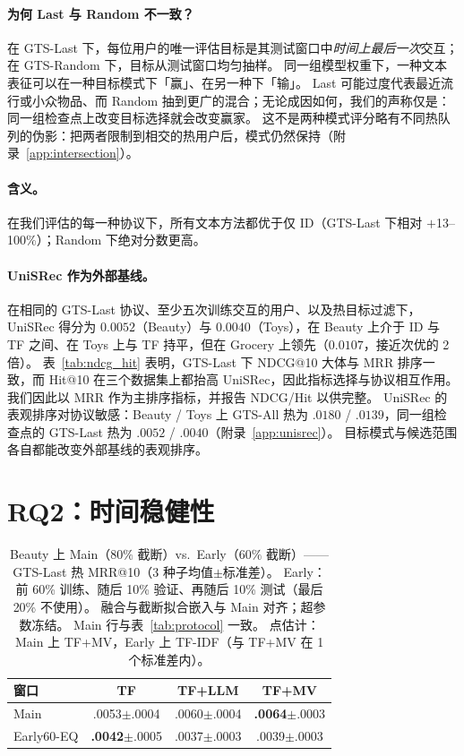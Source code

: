 \documentclass[sigconf,natbib=true,anonymous]{acmart}
\newcommand{\tfidf}{\textsc{TF-IDF}\xspace}
\newcommand{\tfmv}{\textsc{TF+MV}\xspace}
\begin{document}
\paragraph{为何 Last 与 Random 不一致？}
在 GTS-Last 下，每位用户的唯一评估目标是其测试窗口中\emph{时间上最后一次}交互；在 GTS-Random 下，目标从测试窗口均匀抽样。
同一组模型权重下，一种文本表征可以在一种目标模式下「赢」、在另一种下「输」。
Last 可能过度代表最近流行或小众物品、而 Random 抽到更广的混合；无论成因如何，我们的声称仅是：同一组检查点上改变目标选择就会改变赢家。
这不是两种模式评分略有不同热队列的伪影：把两者限制到相交的热用户后，模式仍然保持（附录~\ref{app:intersection}）。

\paragraph{含义。}
在我们评估的每一种协议下，所有文本方法都优于仅 ID（GTS-Last 下相对 $+$13--100\%）；Random 下绝对分数更高。

\paragraph{UniSRec 作为外部基线。}
在相同的 GTS-Last 协议、至少五次训练交互的用户、以及热目标过滤下，UniSRec 得分为 $0.0052$（Beauty）与 $0.0040$（Toys），在 Beauty 上介于 ID 与 TF 之间、在 Toys 上与 TF 持平，但在 Grocery 上领先（$0.0107$，接近次优的 2 倍）。
表~\ref{tab:ndcg_hit} 表明，GTS-Last 下 NDCG@10 大体与 MRR 排序一致，而 Hit@10 在三个数据集上都抬高 UniSRec，因此指标选择与协议相互作用。
我们因此以 MRR 作为主排序指标，并报告 NDCG/Hit 以供完整。
UniSRec 的表观排序对协议敏感：Beauty / Toys 上 GTS-All 热为 $.0180$ / $.0139$，同一组检查点的 GTS-Last 热为 $.0052$ / $.0040$（附录~\ref{app:unisrec}）。
目标模式与候选范围各自都能改变外部基线的表观排序。

\section{RQ2：时间稳健性}
\label{sec:rq2}

\begin{table}[t]
\centering
\caption{%
Beauty 上 Main（$80\%$ 截断）vs.\ Early（$60\%$ 截断）——GTS-Last 热 MRR@10（3 种子均值$\pm$标准差）。
Early：前 60\% 训练、随后 10\% 验证、再随后 10\% 测试（最后 20\% 不使用）。
融合与截断拟合嵌入与 Main 对齐；超参数冻结。
Main 行与表~\ref{tab:protocol} 一致。
点估计：Main 上 \tfmv，Early 上 \tfidf（与 \tfmv 在 1 个标准差内）。%
}
\label{tab:early}
\small
\begin{tabular}{@{}lccc@{}}
\toprule
窗口 & TF & TF+LLM & TF+MV \\
\midrule
Main      & .0053\tiny{$\pm$.0004} & .0060\tiny{$\pm$.0004} & \textbf{.0064}\tiny{$\pm$.0003} \\
Early60-EQ & \textbf{.0042}\tiny{$\pm$.0005} & .0037\tiny{$\pm$.0003} & .0039\tiny{$\pm$.0003} \\
\bottomrule
\end{tabular}
\end{table}
\end{document}
